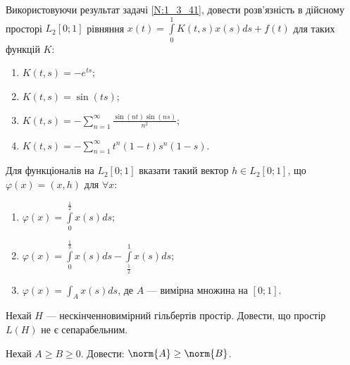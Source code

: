 \begin{exercise}
    Використовуючи результат задачі \ref{N:1_3_41}, довести розв'язність в дійсному просторі $L_2[0; 1]$ рівняння
    $x(t) = \int\limits_{0}^1 K(t, s)x(s)ds + f(t)$ для таких функцій $K$:
    \begin{enumerate}[label=\ukr*)]
        \item $K(t, s) = -e^{ts}$;
        \item $K(t, s) = \sin(ts)$;
        \item $K(t, s) = -\sum\limits_{n = 1}^\infty \frac{\sin(nt)\sin(ns)}{n^2}$;
        \item $K(t, s) = -\sum\limits_{n = 1}^\infty t^n(1-t)s^n(1-s)$.
    \end{enumerate}
\end{exercise}

\begin{exercise}
    Для функціоналів на $L_2[0; 1]$ вказати такий вектор $h \in L_2[0; 1]$, що $\varphi(x) = (x, h)$ для $\forall x$:
    \begin{enumerate}[label=\ukr*)]
        \item $\varphi(x) = \int\limits_{0}^{\frac{1}{2}}x(s)ds$;
        \item $\varphi(x) = \int\limits_{0}^{\frac{1}{3}}x(s)ds - \int\limits_{\frac{1}{2}}^{1}x(s)ds$;
        \item $\varphi(x) = \int_A x(s)ds$, де $A$ --- вимірна множина на $[0; 1]$.
    \end{enumerate}
\end{exercise}

\begin{exercise}
    Нехай $H$ --- нескінченновимірний гільбертів простір. Довести, що простір $L(H)$ не є сепарабельним.
\end{exercise}

\begin{exercise}
    Нехай $A \geq B \geq 0$. Довести: $\norm{A} \geq \norm{B}$.
\end{exercise}